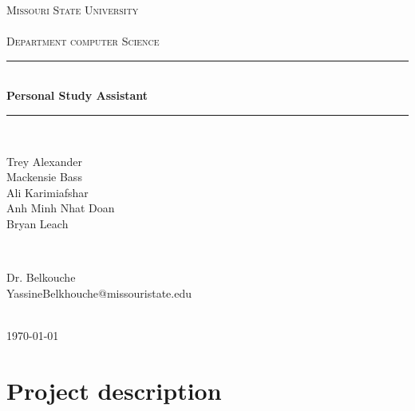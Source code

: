 \documentclass[12pt]{article}
\begin{document}
\begin{titlepage}

    \newcommand{\HRule}{\rule{\linewidth}{0.5mm}}

    \center

    \textsc{\LARGE Missouri State University\\~\\Department computer Science}\\[1.0cm]

    \HRule \\[0.4cm]
    { \huge \bfseries Personal Study Assistant}\\[0.4cm]
    \HRule \\[1.5cm]


    \begin{minipage}{0.4\textwidth}
        \begin{flushleft} \large
            Trey Alexander \\
            Mackensie Bass \\
            Ali Karimiafshar \\
            Anh Minh Nhat Doan \\
            Bryan Leach \\
        \end{flushleft}
    \end{minipage}
    ~
    \begin{minipage}{0.4\textwidth}
        \begin{flushright} \large
            Dr. Belkouche \\
            YassineBelkhouche@missouristate.edu
        \end{flushright}
    \end{minipage}\\[2cm]

    {\large \today}\\[2cm]

\end{titlepage}

\newpage
\tableofcontents

\newpage

\section{Project description}
\end{document}
